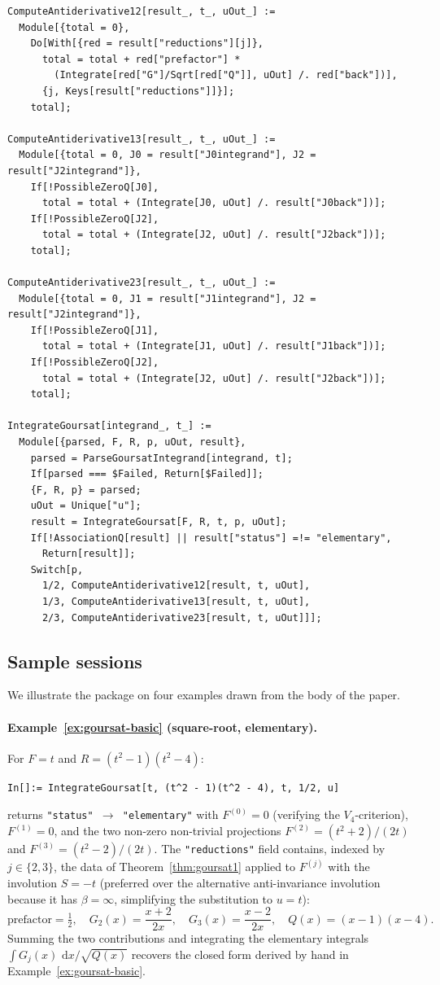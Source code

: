 \documentclass[11pt,a4paper]{article}
\theoremstyle{plain}
\theoremstyle{definition}
\theoremstyle{remark}
\renewcommand{\d}{\,\mathrm{d}}
\begin{document}
\begin{lstlisting}
ComputeAntiderivative12[result_, t_, uOut_] :=
  Module[{total = 0},
    Do[With[{red = result["reductions"][j]},
      total = total + red["prefactor"] *
        (Integrate[red["G"]/Sqrt[red["Q"]], uOut] /. red["back"])],
      {j, Keys[result["reductions"]]}];
    total];

ComputeAntiderivative13[result_, t_, uOut_] :=
  Module[{total = 0, J0 = result["J0integrand"], J2 = result["J2integrand"]},
    If[!PossibleZeroQ[J0],
      total = total + (Integrate[J0, uOut] /. result["J0back"])];
    If[!PossibleZeroQ[J2],
      total = total + (Integrate[J2, uOut] /. result["J2back"])];
    total];

ComputeAntiderivative23[result_, t_, uOut_] :=
  Module[{total = 0, J1 = result["J1integrand"], J2 = result["J2integrand"]},
    If[!PossibleZeroQ[J1],
      total = total + (Integrate[J1, uOut] /. result["J1back"])];
    If[!PossibleZeroQ[J2],
      total = total + (Integrate[J2, uOut] /. result["J2back"])];
    total];

IntegrateGoursat[integrand_, t_] :=
  Module[{parsed, F, R, p, uOut, result},
    parsed = ParseGoursatIntegrand[integrand, t];
    If[parsed === $Failed, Return[$Failed]];
    {F, R, p} = parsed;
    uOut = Unique["u"];
    result = IntegrateGoursat[F, R, t, p, uOut];
    If[!AssociationQ[result] || result["status"] =!= "elementary",
      Return[result]];
    Switch[p,
      1/2, ComputeAntiderivative12[result, t, uOut],
      1/3, ComputeAntiderivative13[result, t, uOut],
      2/3, ComputeAntiderivative23[result, t, uOut]]];
\end{lstlisting}

\subsection*{Sample sessions}

We illustrate the package on four examples drawn from the body of the paper.

\paragraph{Example~\ref{ex:goursat-basic} (square-root, elementary).} For $F=t$ and $R=(t^2-1)(t^2-4)$:
\begin{lstlisting}[basicstyle=\footnotesize\ttfamily,frame=none]
In[]:= IntegrateGoursat[t, (t^2 - 1)(t^2 - 4), t, 1/2, u]
\end{lstlisting}
returns \texttt{"status"\,$\to$\,"elementary"} with $F^{(0)} = 0$ (verifying the $V_4$-criterion), $F^{(1)} = 0$, and the two non-zero non-trivial projections $F^{(2)} = (t^2+2)/(2t)$ and $F^{(3)} = (t^2-2)/(2t)$. The \texttt{"reductions"} field contains, indexed by $j\in\{2,3\}$, the data of Theorem~\ref{thm:goursat1} applied to $F^{(j)}$ with the involution $S = -t$ (preferred over the alternative anti-invariance involution because it has $\beta=\infty$, simplifying the substitution to $u=t$):
\[
  \text{prefactor} = \tfrac{1}{2},\quad
  G_2(x) = \frac{x+2}{2x},\quad G_3(x) = \frac{x-2}{2x},\quad
  Q(x) = (x-1)(x-4).
\]
Summing the two contributions and integrating the elementary integrals $\int G_j(x)\,\d x/\sqrt{Q(x)}$ recovers the closed form derived by hand in Example~\ref{ex:goursat-basic}.
\end{document}
